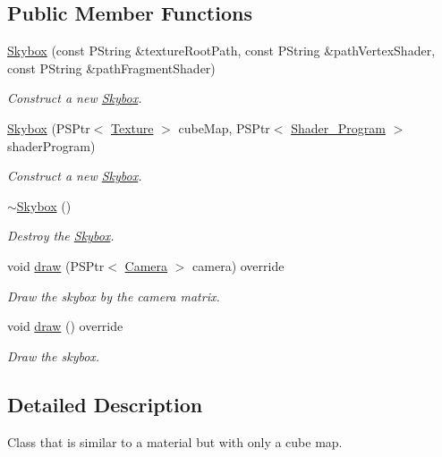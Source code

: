 \subsection*{Public Member Functions}
\begin{DoxyCompactItemize}
\item 
\mbox{\hyperlink{classprz_1_1_skybox_aef3ae2ac798250a694da015213e15f07}{Skybox}} (const P\+String \&texture\+Root\+Path, const P\+String \&path\+Vertex\+Shader, const P\+String \&path\+Fragment\+Shader)
\begin{DoxyCompactList}\small\item\em Construct a new \mbox{\hyperlink{classprz_1_1_skybox}{Skybox}}. \end{DoxyCompactList}\item 
\mbox{\hyperlink{classprz_1_1_skybox_ad924fe508676a78665ad2497b264ea3f}{Skybox}} (P\+S\+Ptr$<$ \mbox{\hyperlink{classprz_1_1_texture}{Texture}} $>$ cube\+Map, P\+S\+Ptr$<$ \mbox{\hyperlink{classprz_1_1_shader___program}{Shader\+\_\+\+Program}} $>$ shader\+Program)
\begin{DoxyCompactList}\small\item\em Construct a new \mbox{\hyperlink{classprz_1_1_skybox}{Skybox}}. \end{DoxyCompactList}\item 
\mbox{\hyperlink{classprz_1_1_skybox_aaa7b576943c21c939f3de52ef5f57043}{$\sim$\+Skybox}} ()
\begin{DoxyCompactList}\small\item\em Destroy the \mbox{\hyperlink{classprz_1_1_skybox}{Skybox}}. \end{DoxyCompactList}\item 
void \mbox{\hyperlink{classprz_1_1_skybox_a8a55c1baca43d28ec7d13c68828b7bb8}{draw}} (P\+S\+Ptr$<$ \mbox{\hyperlink{classprz_1_1_camera}{Camera}} $>$ camera) override
\begin{DoxyCompactList}\small\item\em Draw the skybox by the camera matrix. \end{DoxyCompactList}\item 
void \mbox{\hyperlink{classprz_1_1_skybox_aec1e6ca523b459acf02df4800e27de23}{draw}} () override
\begin{DoxyCompactList}\small\item\em Draw the skybox. \end{DoxyCompactList}\end{DoxyCompactItemize}


\subsection{Detailed Description}
Class that is similar to a material but with only a cube map. 



